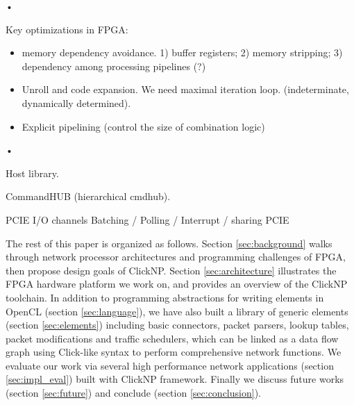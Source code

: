 {\begin{itemize}
\end{itemize}•


Key optimizations in FPGA:
\begin{itemize}
\item memory dependency avoidance. 1) buffer registers; 2) memory stripping; 3) dependency among processing pipelines (?) 
\item Unroll and code expansion. We need maximal iteration loop. (indeterminate, dynamically determined). 
\item Explicit pipelining (control the size of combination logic)
\end{itemize}•


Host library.

CommandHUB (hierarchical cmdhub).

PCIE I/O channels
Batching / Polling / Interrupt / sharing PCIE 

The rest of this paper is organized as follows. Section \ref{sec:background} walks through network processor architectures and programming challenges of FPGA, then propose design goals of ClickNP. Section \ref{sec:architecture} illustrates the FPGA hardware platform we work on, and provides an overview of the ClickNP toolchain. In addition to programming abstractions for writing elements in OpenCL (section \ref{sec:language}), we have also built a library of generic elements (section \ref{sec:elements}) including basic connectors, packet parsers, lookup tables, packet modifications and traffic schedulers, which can be linked as a data flow graph using Click-like syntax to perform comprehensive network functions. We evaluate our work via several high performance network applications (section \ref{sec:impl_eval}) built with ClickNP framework. Finally we discuss future works (section \ref{sec:future}) and conclude (section \ref{sec:conclusion}).
}
